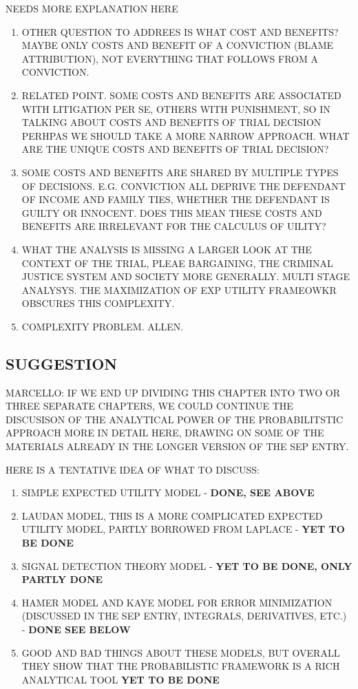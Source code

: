\documentclass[
  10pt,
  dvipsnames,enabledeprecatedfontcommands]{scrartcl}
\begin{document}
NEEDS MORE EXPLANATION HERE

\begin{enumerate}
\def\labelenumi{\arabic{enumi})}
\item
  OTHER QUESTION TO ADDREES IS WHAT COST AND BENEFITS? MAYBE ONLY COSTS
  AND BENEFIT OF A CONVICTION (BLAME ATTRIBUTION), NOT EVERYTHING THAT
  FOLLOWS FROM A CONVICTION.
\item
  RELATED POINT. SOME COSTS AND BENEFITS ARE ASSOCIATED WITH LITIGATION
  PER SE, OTHERS WITH PUNISHMENT, SO IN TALKING ABOUT COSTS AND BENEFITS
  OF TRIAL DECISION PERHPAS WE SHOULD TAKE A MORE NARROW APPROACH. WHAT
  ARE THE UNIQUE COSTS AND BENEFITS OF TRIAL DECISION?
\item
  SOME COSTS AND BENEFITS ARE SHARED BY MULTIPLE TYPES OF DECISIONS.
  E.G. CONVICTION ALL DEPRIVE THE DEFENDANT OF INCOME AND FAMILY TIES,
  WHETHER THE DEFENDANT IS GUILTY OR INNOCENT. DOES THIS MEAN THESE
  COSTS AND BENEFITS ARE IRRELEVANT FOR THE CALCULUS OF UILITY?
\item
  WHAT THE ANALYSIS IS MISSING A LARGER LOOK AT THE CONTEXT OF THE
  TRIAL, PLEAE BARGAINING, THE CRIMINAL JUSTICE SYSTEM AND SOCIETY MORE
  GENERALLY. MULTI STAGE ANALYSYS. THE MAXIMIZATION OF EXP UTILITY
  FRAMEOWKR OBSCURES THIS COMPLEXITY.
\item
  COMPLEXITY PROBLEM. ALLEN.
\end{enumerate}

\subsection{SUGGESTION}

MARCELLO: IF WE END UP DIVIDING THIS CHAPTER INTO TWO OR THREE SEPARATE
CHAPTERS, WE COULD CONTINUE THE DISCUSISON OF THE ANALYTICAL POWER OF
THE PROBABILITSTIC APPROACH MORE IN DETAIL HERE, DRAWING ON SOME OF THE
MATERIALS ALREADY IN THE LONGER VERSION OF THE SEP ENTRY.

HERE IS A TENTATIVE IDEA OF WHAT TO DISCUSS:

\begin{enumerate}
\def\labelenumi{(\arabic{enumi})}
\item
  SIMPLE EXPECTED UTILITY MODEL - \textbf{DONE, SEE ABOVE}
\item
  LAUDAN MODEL, THIS IS A MORE COMPLICATED EXPECTED UTILITY MODEL,
  PARTLY BORROWED FROM LAPLACE - \textbf{YET TO BE DONE}
\item
  SIGNAL DETECTION THEORY MODEL -
  \textbf{YET TO BE DONE, ONLY PARTLY DONE}
\item
  HAMER MODEL AND KAYE MODEL FOR ERROR MINIMIZATION (DISCUSSED IN THE
  SEP ENTRY, INTEGRALS, DERIVATIVES, ETC.) - \textbf{DONE SEE BELOW}
\item
  GOOD AND BAD THINGS ABOUT THESE MODELS, BUT OVERALL THEY SHOW THAT THE
  PROBABILISTIC FRAMEWORK IS A RICH ANALYTICAL TOOL
  \textbf{YET TO BE DONE}
\end{enumerate}
\end{document}
